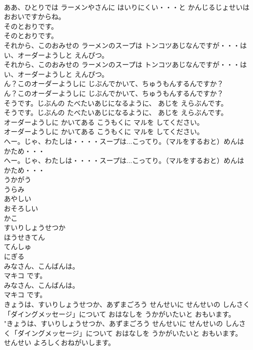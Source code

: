 \documentclass[8pt]{extreport}
\begin{document}
\begin{CJK}{UTF8}{min}
\\	ああ、ひとりでは ラーメンやさんに はいりにくい・・・と かんじるじょせいは おおいですからね。 
\\	そのとおりです。	
\\	そのとおりです。 
\\	それから、このおみせの ラーメンのスープは トンコツあじなんですが・・・はい、オーダーようしと えんぴつ。	
\\	それから、このおみせの ラーメンのスープは トンコツあじなんですが・・・はい、オーダーようしと えんぴつ。 
\\	ん？このオーダーようしに じぶんでかいて、ちゅうもんするんですか？	
\\	ん？このオーダーようしに じぶんでかいて、ちゅうもんするんですか？ 
\\	そうです。じぶんの たべたいあじになるように、 あじを えらぶんです。	
\\	そうです。じぶんの たべたいあじになるように、 あじを えらぶんです。 
\\	オーダーようしに かいてある こうもくに マルを してください。	
\\	オーダーようしに かいてある こうもくに マルを してください。 
\\	へー。じゃ、わたしは・・・・スープは...こってり。（マルをするおと）めんは かため・・・	
\\	へー。じゃ、わたしは・・・・スープは...こってり。（マルをするおと）めんは かため・・・ 
\\	うかがう
\\	うらみ
\\	あやしい
\\	おそろしい
\\	かこ
\\	すいりしょうせつか
\\	ほうせきてん
\\	てんしゅ
\\	にぎる
\\	みなさん、こんばんは。
\\	マキコ です。	
\\	みなさん、こんばんは。
\\	マキコ です。 
\\	きょうは、すいりしょうせつか、あずまごろう せんせいに せんせいの しんさく「ダイングメッセージ」について おはなしを うかがいたいと おもいます。	
\\	"きょうは、すいりしょうせつか、あずまごろう せんせいに せんせいの しんさく「ダイングメッセージ」について おはなしを うかがいたいと おもいます。 
\\	せんせい よろしくおねがいします。	

\end{CJK}
\end{document}
